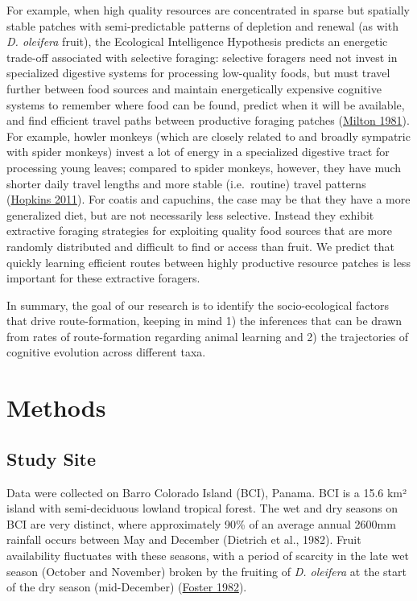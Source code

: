\documentclass[twoside,12pt,final]{ucthesis-CA2012}
\begin{document}
\begin{ucmainmatter}
For example, when high quality resources are concentrated in sparse but spatially stable patches with semi-predictable patterns of depletion and renewal (as with \emph{D. oleifera} fruit), the Ecological Intelligence Hypothesis predicts an energetic trade-off associated with selective foraging: selective foragers need not invest in specialized digestive systems for processing low-quality foods, but must travel further between food sources and maintain energetically expensive cognitive systems to remember where food can be found, predict when it will be available, and find efficient travel paths between productive foraging patches (\protect\hyperlink{ref-milton1981}{Milton 1981}). For example, howler monkeys (which are closely related to and broadly sympatric with spider monkeys) invest a lot of energy in a specialized digestive tract for processing young leaves; compared to spider monkeys, however, they have much shorter daily travel lengths and more stable (i.e.~routine) travel patterns (\protect\hyperlink{ref-hopkins2011}{Hopkins 2011}). For coatis and capuchins, the case may be that they have a more generalized diet, but are not necessarily less selective. Instead they exhibit extractive foraging strategies for exploiting quality food sources that are more randomly distributed and difficult to find or access than fruit. We predict that quickly learning efficient routes between highly productive resource patches is less important for these extractive foragers.

In summary, the goal of our research is to identify the socio-ecological factors that drive route-formation, keeping in mind 1) the inferences that can be drawn from rates of route-formation regarding animal learning and 2) the trajectories of cognitive evolution across different taxa.

\hypertarget{methods-2}{%
\section{Methods}\label{methods-2}}

\hypertarget{study-site-1}{%
\subsection{Study Site}\label{study-site-1}}

Data were collected on Barro Colorado Island (BCI), Panama. BCI is a 15.6 km² island with semi-deciduous lowland tropical forest. The wet and dry seasons on BCI are very distinct, where approximately 90\% of an average annual 2600mm rainfall occurs between May and December (Dietrich et al., 1982). Fruit availability fluctuates with these seasons, with a period of scarcity in the late wet season (October and November) broken by the fruiting of \emph{D. oleifera} at the start of the dry season (mid-December) (\protect\hyperlink{ref-foster1982ecology}{Foster 1982}).


\end{ucmainmatter}
\end{document}
